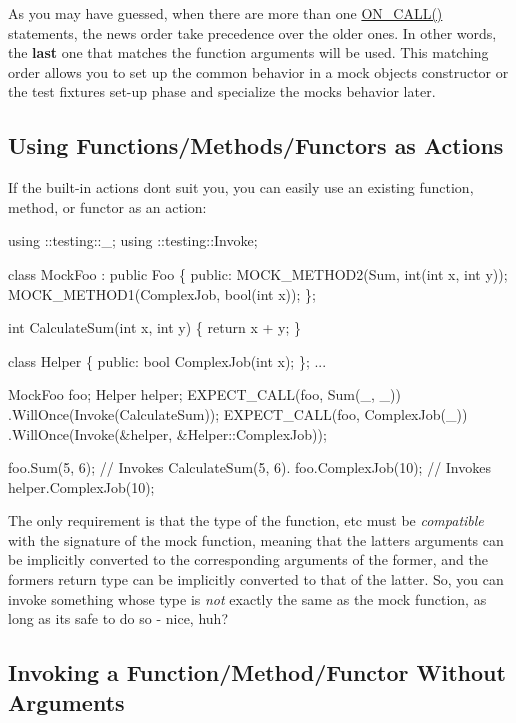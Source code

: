 As you may have guessed, when there are more than one {\ttfamily \hyperlink{gmock-spec-builders_8h_a5b12ae6cf84f0a544ca811b380c37334}{O\+N\+\_\+\+C\+A\+L\+L()}} statements, the news order take precedence over the older ones. In other words, the {\bfseries last} one that matches the function arguments will be used. This matching order allows you to set up the common behavior in a mock object\textquotesingle{}s constructor or the test fixture\textquotesingle{}s set-\/up phase and specialize the mock\textquotesingle{}s behavior later.

\subsection*{Using Functions/\+Methods/\+Functors as Actions}

If the built-\/in actions don\textquotesingle{}t suit you, you can easily use an existing function, method, or functor as an action\+:


\begin{DoxyCode}
using ::testing::\_;
using ::testing::Invoke;

class MockFoo : public Foo \{
 public:
  MOCK\_METHOD2(Sum, int(int x, int y));
  MOCK\_METHOD1(ComplexJob, bool(int x));
\};

int CalculateSum(int x, int y) \{ return x + y; \}

class Helper \{
 public:
  bool ComplexJob(int x);
\};
...

  MockFoo foo;
  Helper helper;
  EXPECT\_CALL(foo, Sum(\_, \_))
      .WillOnce(Invoke(CalculateSum));
  EXPECT\_CALL(foo, ComplexJob(\_))
      .WillOnce(Invoke(&helper, &Helper::ComplexJob));

  foo.Sum(5, 6);       // Invokes CalculateSum(5, 6).
  foo.ComplexJob(10);  // Invokes helper.ComplexJob(10);
\end{DoxyCode}


The only requirement is that the type of the function, etc must be {\itshape compatible} with the signature of the mock function, meaning that the latter\textquotesingle{}s arguments can be implicitly converted to the corresponding arguments of the former, and the former\textquotesingle{}s return type can be implicitly converted to that of the latter. So, you can invoke something whose type is {\itshape not} exactly the same as the mock function, as long as it\textquotesingle{}s safe to do so -\/ nice, huh?

\subsection*{Invoking a Function/\+Method/\+Functor Without Arguments}

